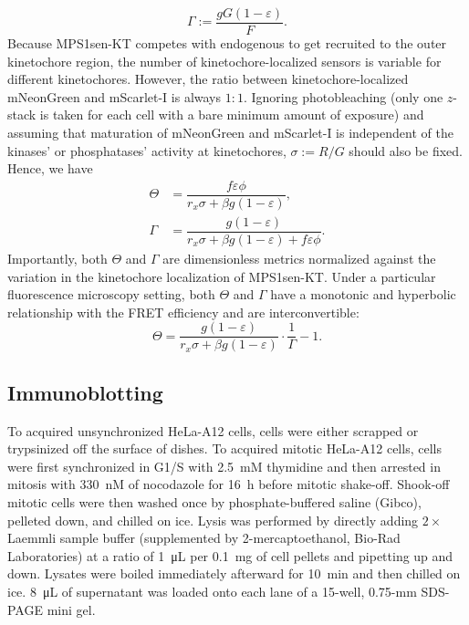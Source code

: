 \begin{equation*}
    \Gamma := \dfrac{gG(1 - \varepsilon)}{F}.
\end{equation*}
Because MPS1sen-KT competes with endogenous  to get recruited to the outer kinetochore region, the number of kinetochore-localized sensors is variable for different kinetochores. However, the ratio between kinetochore-localized mNeonGreen and mScarlet-I is always $1 : 1$. Ignoring photobleaching (only one $z$-stack is taken for each cell with a bare minimum amount of exposure) and assuming that maturation of mNeonGreen and mScarlet-I is independent of the kinases' or phosphatases' activity at kinetochores, $\sigma := R/G$ should also be fixed. Hence, we have
\begin{align*}
    \Theta &= \dfrac{f\varepsilon\phi}{r_x\sigma + \beta g(1 - \varepsilon)},\\
    \Gamma &= \dfrac{g(1 - \varepsilon)}{r_x\sigma + \beta g(1 - \varepsilon) + f\varepsilon\phi}.
\end{align*}
Importantly, both $\Theta$ and $\Gamma$ are dimensionless metrics normalized against the variation in the kinetochore localization of MPS1sen-KT. Under a particular fluorescence microscopy setting, both $\Theta$ and $\Gamma$ have a monotonic and hyperbolic relationship with the FRET efficiency and are interconvertible:
\begin{equation*}
    \Theta = \dfrac{g(1 - \varepsilon)}{r_x\sigma + \beta g(1 - \varepsilon)}\cdot\dfrac{1}{\Gamma} - 1.
\end{equation*}

\subsection{Immunoblotting}
\label{WBMethods}
To acquired unsynchronized HeLa-A12 cells, cells were either scrapped or trypsinized off the surface of dishes. To acquired mitotic HeLa-A12 cells, cells were first synchronized in G1/S with \SI{2.5}{mM} thymidine and then arrested in mitosis with \SI{330}{nM} of nocodazole for \SI{16}{h} before mitotic shake-off. Shook-off mitotic cells were then washed once by phosphate-buffered saline (Gibco), pelleted down, and chilled on ice. Lysis was performed by directly adding $2 \times$ Laemmli sample buffer (supplemented by 2-mercaptoethanol, Bio-Rad Laboratories) at a ratio of \SI{1}{\micro L} per \SI{0.1}{mg} of cell pellets and pipetting up and down. Lysates were boiled immediately afterward for \SI{10}{min} and then chilled on ice. \SI{8}{\micro L} of supernatant was loaded onto each lane of a 15-well, 0.75-mm SDS-PAGE mini gel.

